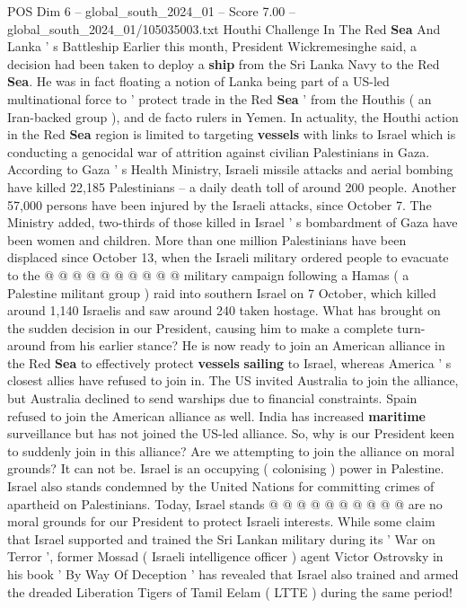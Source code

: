 \begin{textsample}{POS Dim 6 – global\_south\_2024\_01 – Score 7.00 – global\_south\_2024\_01/105035003.txt}  \label{ex:f6_pos_094}
Houthi Challenge In The Red \textbf{Sea} And Lanka ' s Battleship Earlier this month, President Wickremesinghe said, a decision had been taken to deploy a \textbf{ship} from the Sri Lanka Navy to the Red \textbf{Sea}.
He was in fact floating a notion of Lanka being part of a US-led multinational force to ' protect trade in the Red \textbf{Sea} ' from the Houthis ( an Iran-backed group ), and de facto rulers in Yemen.
In actuality, the Houthi action in the Red \textbf{Sea} region is limited to targeting \textbf{vessels} with links to Israel which is conducting a genocidal war of attrition against civilian Palestinians in Gaza.
According to Gaza ' s Health Ministry, Israeli missile attacks and aerial bombing have killed 22,185 Palestinians -- a daily death toll of around 200 people.
Another 57,000 persons have been injured by the Israeli attacks, since October 7.
The Ministry added, two-thirds of those killed in Israel ' s bombardment of Gaza have been women and children.
More than one million Palestinians have been displaced since October 13, when the Israeli military ordered people to evacuate to the @ @ @ @ @ @ @ @ @ @ military campaign following a Hamas ( a Palestine militant group ) raid into southern Israel on 7 October, which killed around 1,140 Israelis and saw around 240 taken hostage.
What has brought on the sudden decision in our President, causing him to make a complete turn-around from his earlier stance?
He is now ready to join an American alliance in the Red \textbf{Sea} to effectively protect \textbf{vessels} \textbf{sailing} to Israel, whereas America ' s closest allies have refused to join in.
The US invited Australia to join the alliance, but Australia declined to send warships due to financial constraints.
Spain refused to join the American alliance as well.
India has increased \textbf{maritime} surveillance but has not joined the US-led alliance.
So, why is our President keen to suddenly join in this alliance?
Are we attempting to join the alliance on moral grounds?
It can not be.
Israel is an occupying ( colonising ) power in Palestine.
Israel also stands condemned by the United Nations for committing crimes of apartheid on Palestinians.
Today, Israel stands @ @ @ @ @ @ @ @ @ @ are no moral grounds for our President to protect Israeli interests.
While some claim that Israel supported and trained the Sri Lankan military during its ' War on Terror ', former Mossad ( Israeli intelligence officer ) agent Victor Ostrovsky in his book ' By Way Of Deception ' has revealed that Israel also trained and armed the dreaded Liberation Tigers of Tamil Eelam ( LTTE ) during the same period!

\end{textsample}
